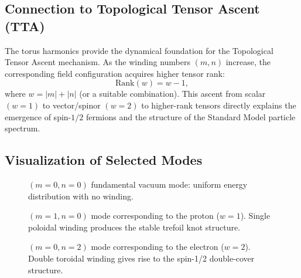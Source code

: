 \documentclass[11pt,a4paper]{article}
\begin{document}
\subsection{Connection to Topological Tensor Ascent (TTA)}
The torus harmonics provide the dynamical foundation for the Topological Tensor Ascent mechanism. As the winding numbers \((m,n)\) increase, the corresponding field configuration acquires higher tensor rank:
\begin{equation}
\mathrm{Rank}(w) = w - 1, \tag{23}
\end{equation}
where \(w = |m| + |n|\) (or a suitable combination). This ascent from scalar \((w = 1)\) to vector/spinor \((w = 2)\) to higher-rank tensors directly explains the emergence of spin-\(1/2\) fermions and the structure of the Standard Model particle spectrum.

\subsection{Visualization of Selected Modes}

\begin{figure}[H]
\centering
{}
\caption{\((m=0,n=0)\) fundamental vacuum mode: uniform energy distribution with no winding.}
\end{figure}

\begin{figure}[H]
\centering
{}
\caption{\((m=1,n=0)\) mode corresponding to the proton (\(w=1\)). Single poloidal winding produces the stable trefoil knot structure.}
\end{figure}

\begin{figure}[H]
\centering
{}
\caption{\((m=0,n=2)\) mode corresponding to the electron (\(w=2\)). Double toroidal winding gives rise to the spin-1/2 double-cover structure.}
\end{figure}
\end{document}
